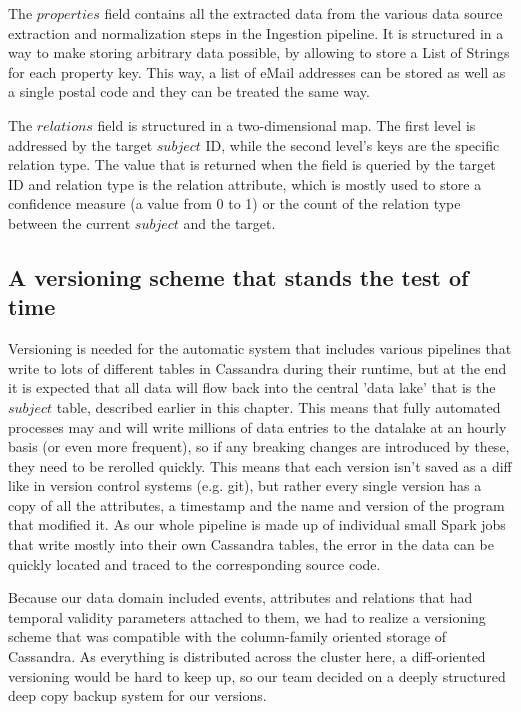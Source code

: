 \documentclass[
        a4paper,     %
        titlepage,   %
        oneside,     %
        parskip      %
        ]{scrartcl}  %
\begin{document}
    The $properties$ field contains all the extracted data from the various
    data source extraction and normalization steps in the Ingestion pipeline.
    It is structured in a way to make storing arbitrary data possible, by allowing
    to store a List of Strings for each property key. This way, a list of
    eMail addresses can be stored as well as a single postal code and they can
    be treated the same way.

    The $relations$ field is structured in a two-dimensional map. The first level
    is addressed by the target $subject$ ID, while the second level's keys are the
    specific relation type. The value that is returned when the field is queried
    by the target ID and relation type is the relation attribute, which is mostly
    used to store a confidence measure (a value from 0 to 1) or the count of the
    relation type between the current $subject$ and the target.

    \subsection{A versioning scheme that stands the test of time}
    Versioning is needed for the automatic system that includes various pipelines
    that write to lots of different tables in Cassandra during their runtime,
    but at the end it is expected that all data will flow back into the central
    'data lake' that is the $subject$ table, described earlier in this chapter.
    This means that fully automated processes may and will write millions of
    data entries to the datalake at an hourly basis (or even more frequent),
    so if any breaking changes are introduced by these, they need to be rerolled quickly.
    This means that each version isn't saved as a diff like in version control systems
    (e.g. git), but rather every single version has a copy of all the attributes,
    a timestamp and the name and version of the program that modified it.
    As our whole pipeline is made up of individual small Spark jobs that write
    mostly into their own Cassandra tables, the error in the data can be quickly
    located and traced to the corresponding source code.

    Because our data domain included events, attributes and relations that had
    temporal validity parameters attached to them, we had to realize a versioning
    scheme that was compatible with the column-family oriented storage of Cassandra.
    As everything is distributed across the cluster here, a diff-oriented versioning
    would be hard to keep up, so our team decided on a deeply structured deep copy
    backup system for our versions.
\end{document}
